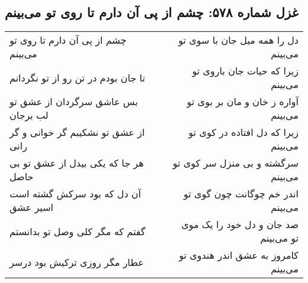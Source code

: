 \begin{center}
\section*{غزل شماره ۵۷۸: چشم از پی آن دارم تا روی تو می‌بینم}
\label{sec:578}
\begin{longtable}{l p{0.5cm} r}
چشم از پی آن دارم تا روی تو می‌بینم
&&
دل را همه میل جان با سوی تو می‌بینم
\\
تا جان بودم در تن رو از تو نگردانم
&&
زیرا که حیات جان باروی تو می‌بینم
\\
بس عاشق سرگردان از عشق تو لب برجان
&&
آواره ز خان و مان بر بوی تو می‌بینم
\\
از عشق تو نشکیبم گر خوانی و گر رانی
&&
زیرا که دل افتاده در کوی تو می‌بینم
\\
هر جا که یکی بیدل از عشق تو بی حاصل
&&
سرگشته و بی منزل سر کوی تو می‌بینم
\\
آن دل که بود سرکش گشته است اسیر عشق
&&
اندر خم چوگانت چون گوی تو می‌بینم
\\
گفتم که مگر کلی وصل تو بدانستم
&&
صد جان و دل خود را یک موی تو می‌بینم
\\
عطار مگر روزی ترکیش بود درسر
&&
کامروز به عشق اندر هندوی تو می‌بینم
\\
\end{longtable}
\end{center}
